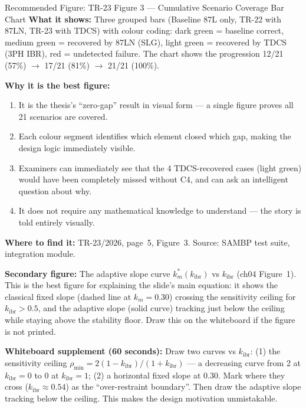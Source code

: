 \documentclass[12pt,a4paper]{article}
\newcommand{\kibr}{k_\mathrm{ibr}}
\newcommand{\km}{k_m}
\begin{document}
\begin{keybox}{Recommended Figure: TR-23 Figure 3 --- Cumulative Scenario Coverage Bar Chart}
\textbf{What it shows:} Three grouped bars (Baseline 87L only, TR-22 with 87LN, TR-23 with TDCS) with colour coding: dark green = baseline correct, medium green = recovered by 87LN (SLG), light green = recovered by TDCS (3PH IBR), red = undetected failure. The chart shows the progression 12/21 (57\%) $\to$ 17/21 (81\%) $\to$ 21/21 (100\%).

\textbf{Why it is the best figure:}
\begin{enumerate}[nosep]
  \item It is the thesis's ``zero-gap'' result in visual form --- a single figure proves all 21 scenarios are covered.
  \item Each colour segment identifies which element closed which gap, making the design logic immediately visible.
  \item Examiners can immediately see that the 4 TDCS-recovered cases (light green) would have been completely missed without C4, and can ask an intelligent question about why.
  \item It does not require any mathematical knowledge to understand --- the story is told entirely visually.
\end{enumerate}

\textbf{Where to find it:} TR-23/2026, page~5, Figure~3. Source: SAMBP test suite, integration module.

\textbf{Secondary figure:} The adaptive slope curve $\km^\ast(\kibr)$ vs $\kibr$ (ch04 Figure~1). This is the best figure for explaining the slide's main equation: it shows the classical fixed slope (dashed line at $\km = 0.30$) crossing the sensitivity ceiling for $\kibr > 0.5$, and the adaptive slope (solid curve) tracking just below the ceiling while staying above the stability floor. Draw this on the whiteboard if the figure is not printed.

\textbf{Whiteboard supplement (60 seconds):} Draw two curves vs $\kibr$: (1) the sensitivity ceiling $\rho_\mathrm{min} = 2(1-\kibr)/(1+\kibr)$ --- a decreasing curve from 2 at $\kibr=0$ to 0 at $\kibr=1$; (2) a horizontal fixed slope at 0.30. Mark where they cross ($\kibr \approx 0.54$) as the ``over-restraint boundary''. Then draw the adaptive slope tracking below the ceiling. This makes the design motivation unmistakable.
\end{keybox}

\end{document}

